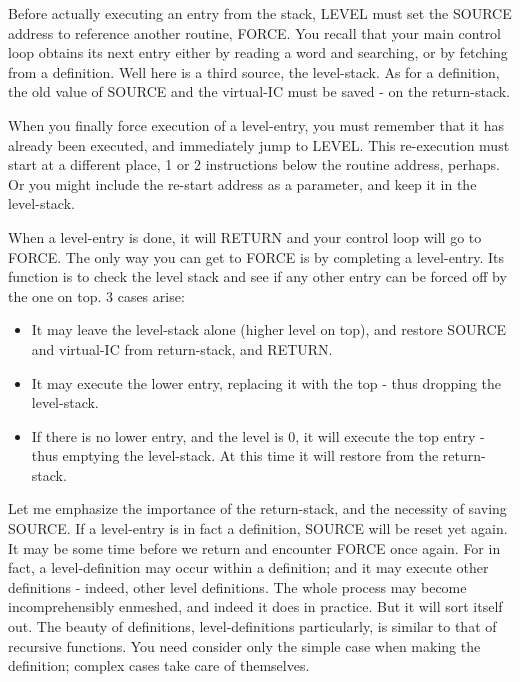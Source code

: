 \documentclass[b5paper, oneside]{book}
\begin{document}
Before actually executing an entry from the stack, LEVEL must set the SOURCE address to reference another routine, FORCE. You recall that your main control loop obtains its next entry either by reading a word and searching, or by fetching from a definition. Well here is a third source, the level-stack. As for a definition, the old value of SOURCE and the virtual-IC must be saved - on the return-stack.

When you finally force execution of a level-entry, you must remember that it has already been executed, and immediately jump to LEVEL. This re-execution must start at a different place, 1 or 2 instructions below the routine address, perhaps. Or you might include the re-start address as a parameter, and keep it in the level-stack.

When a level-entry is done, it will RETURN and your control loop will go to FORCE. The only way you can get to FORCE is by completing a level-entry. Its function is to check the level stack and see if any other entry can be forced off by the one on top. 3 cases arise:\begin{itemize}
   \item It may leave the level-stack alone (higher level on top), and restore SOURCE and virtual-IC from return-stack, and RETURN.
   \item It may execute the lower entry, replacing it with the top - thus dropping the level-stack.
   \item If there is no lower entry, and the level is 0, it will execute the top entry - thus emptying the level-stack. At this time it will restore from the return-stack.\end{itemize}
Let me emphasize the importance of the return-stack, and the necessity of saving SOURCE. If a level-entry is in fact a definition, SOURCE will be reset yet again. It may be some time before we return and encounter FORCE once again. For in fact, a level-definition may occur within a definition; and it may execute other definitions - indeed, other level definitions. The whole process may become incomprehensibly enmeshed, and indeed it does in practice. But it will sort itself out. The beauty of definitions, level-definitions particularly, is similar to that of recursive functions. You need consider only the simple case when making the definition; complex cases take care of themselves.
\end{document}
